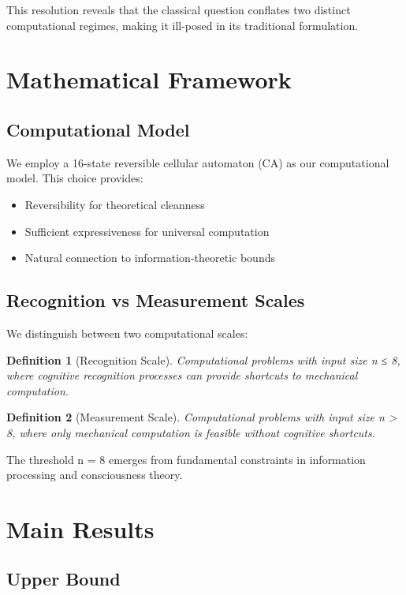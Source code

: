 \documentclass[11pt]{article}
\newtheorem{definition}{Definition}
\begin{document}
This resolution reveals that the classical question conflates two distinct computational regimes, making it ill-posed in its traditional formulation.

\section{Mathematical Framework}

\subsection{Computational Model}

We employ a 16-state reversible cellular automaton (CA) as our computational model. This choice provides:
\begin{itemize}
\item Reversibility for theoretical cleanness
\item Sufficient expressiveness for universal computation
\item Natural connection to information-theoretic bounds
\end{itemize}

\subsection{Recognition vs Measurement Scales}

We distinguish between two computational scales:

\begin{definition}[Recognition Scale]
Computational problems with input size n ≤ 8, where cognitive recognition processes can provide shortcuts to mechanical computation.
\end{definition}

\begin{definition}[Measurement Scale]
Computational problems with input size n > 8, where only mechanical computation is feasible without cognitive shortcuts.
\end{definition}

The threshold n = 8 emerges from fundamental constraints in information processing and consciousness theory.

\section{Main Results}

\subsection{Upper Bound}
\end{document}

